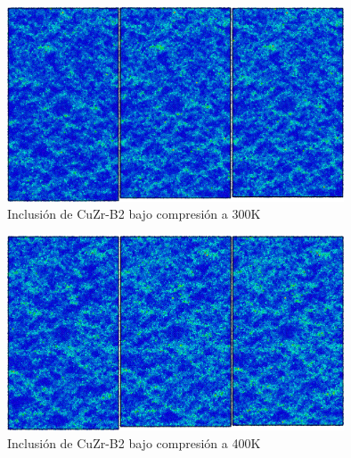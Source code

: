 \documentclass[10pt, oneside]{article} %
\begin{document}
\begin{figure}[H]
\centering
\includegraphics[width=10cm]{Figures/NanoParticles/Snapshots/B2SphereCompression_300K_Snapshots.png}
\caption{Inclusión de CuZr-B2 bajo compresión a 300K}
\end{figure}

\begin{figure}[H]
\centering
\includegraphics[width=10cm]{Figures/NanoParticles/Snapshots/B2SphereCompression_400K_Snapshots.png}
\caption{Inclusión de CuZr-B2 bajo compresión a 400K}
\end{figure}
\end{document}
